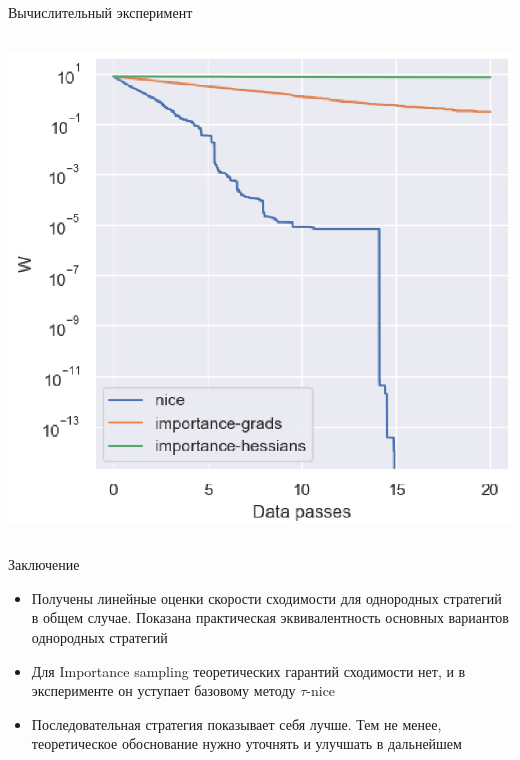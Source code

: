 \documentclass{beamer}
\begin{document}
\begin{frame}{Вычислительный эксперимент}
\begin{columns}[c]
		\includegraphics[width=\textwidth]{importance sampling}
\end{columns}

\end{frame}
\begin{frame}{Заключение}
    \begin{block}{}
    \begin{itemize}
        \item Получены линейные оценки скорости сходимости для однородных стратегий в общем случае. Показана практическая эквивалентность основных вариантов однородных стратегий
        \item Для Importance sampling теоретических гарантий сходимости нет, и в эксперименте он уступает базовому методу $\tau$-nice
        \item Последовательная стратегия показывает себя лучше. Тем не менее, теоретическое обоснование нужно уточнять и улучшать в дальнейшем
    \end{itemize}
    \end{block}
\end{frame}
\end{document}
